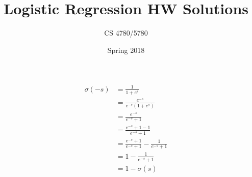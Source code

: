\documentclass{article}
\title{Logistic Regression HW Solutions}
\author{CS 4780/5780}
\date{Spring 2018}
\begin{document}
\maketitle

\section{}
\begin{align*}
	\sigma(-s) & = \frac{1}{1+e^s}\\
			   & = \frac{e^{-s}}{e^{-s}(1+e^s)}\\
			   & =\frac{e^{-s}}{e^{-s} + 1}\\
			   & =\frac{e^{-s} + 1 - 1}{e^{-s} + 1}\\
			   &=\frac{e^{-s} + 1}{e^{-s} + 1} - \frac{1}{e^{-s} + 1} \\
			   &=1 - \frac{1}{e^{-s} + 1}\\
			   &=1 - \sigma(s)   
\end{align*}
\end{document}
